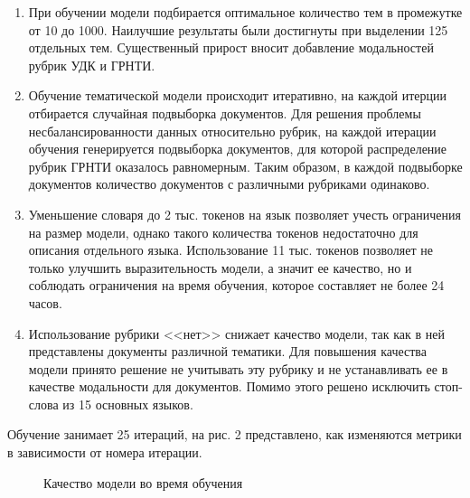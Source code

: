 \documentclass[12pt, twoside]{article}
\begin{document}
\begin{enumerate}

\item При обучении модели подбирается оптимальное количество тем в промежутке от 10 до 1000. Наилучшие результаты были достигнуты при выделении 125 отдельных тем. Существенный прирост вносит добавление модальностей рубрик УДК и ГРНТИ. 

\item Обучение тематической модели происходит итеративно, на каждой итерции отбирается случайная подвыборка документов. Для решения проблемы несбалансированности данных относительно рубрик, на каждой итерации обучения генерируется подвыборка документов, для которой распределение рубрик ГРНТИ оказалось равномерным. Таким образом, в каждой подвыборке документов количество документов с различными рубриками одинаково.

\item Уменьшение словаря до 2 тыс. токенов на язык позволяет учесть ограничения на размер модели, однако такого количества токенов недостаточно для описания отдельного языка. Использование 11 тыс. токенов позволяет не только улучшить выразительность модели, а значит ее качество, но и соблюдать ограничения на время обучения, которое составляет не более 24 часов.

\item Использование рубрики <<нет>> снижает качество модели, так как в ней представлены документы различной тематики. Для повышения качества модели принято решение не учитывать эту рубрику и не устанавливать ее в качестве модальности для документов. Помимо этого решено исключить стоп-слова из 15 основных языков.

\end{enumerate}

Обучение занимает 25 итераций, на рис. 2 представлено, как изменяются метрики в зависимости от номера итерации.


\begin{figure}[H]
  \subfloat{}
  \subfloat{}
 \caption{Качество модели во время обучения}
  \label{fig:1}
\end{figure}
\end{document}
